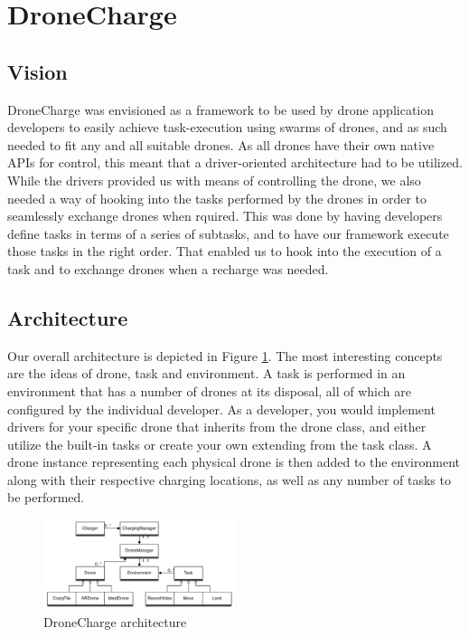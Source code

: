 \section{DroneCharge}
\subsection{Vision}
DroneCharge was envisioned as a framework to be used by drone application developers to easily achieve task-execution using swarms of drones, and as such needed to fit any and all suitable drones. As all drones have their own native APIs for control, this meant that a driver-oriented architecture had to be utilized. While the drivers provided us with means of controlling the drone, we also needed a way of hooking into the tasks performed by the drones in order to seamlessly exchange drones when rquired. This was done by having developers define tasks in terms of a series of subtasks, and to have our framework execute those tasks in the right order. That enabled us to hook into the execution of a task and to exchange drones when a recharge was needed.

\subsection{Architecture}
Our overall architecture is depicted in Figure \ref{fig:architecturefig}. The most interesting concepts are the ideas of drone, task and environment. A task is performed in an environment that has a number of drones at its disposal, all of which are configured by the individual developer. As a developer, you would implement drivers for your specific drone that inherits from the drone class, and either utilize the built-in tasks or create your own extending from the task class. A drone instance representing each physical drone is then added to the environment along with their respective charging locations, as well as any number of tasks to be performed.

\begin{figure}[h]
\includegraphics[width=0.5\textwidth]{images/dronechargearchitecture.png}
\caption{DroneCharge architecture}
\label{fig:architecturefig}
\end{figure}

